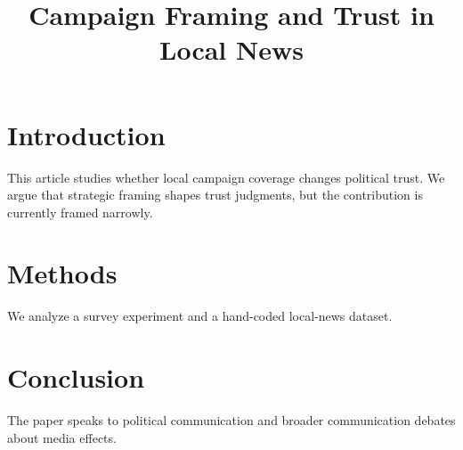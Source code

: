 \documentclass{article}
\begin{document}
\title{Campaign Framing and Trust in Local News}
\maketitle

\section{Introduction}
This article studies whether local campaign coverage changes political trust.
We argue that strategic framing shapes trust judgments, but the contribution is currently framed narrowly.

\section{Methods}
We analyze a survey experiment and a hand-coded local-news dataset.

\section{Conclusion}
The paper speaks to political communication and broader communication debates about media effects.
\end{document}
